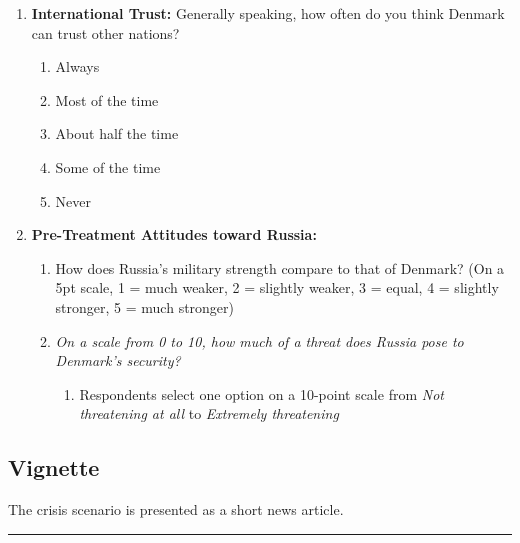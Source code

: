 \begin{enumerate}
\begin{enumerate}
        \begin{enumerate}
            \item While driving
            \item During fitness or leisure
            \item In financial matters
            \item With your own health
            \item In your career
        \end{enumerate}
    \end{enumerate}
    \item \textbf{International Trust:} Generally speaking, how often do you think Denmark can trust other nations? 
    \begin{enumerate}
        \item Always
        \item Most of the time
        \item About half the time
        \item Some of the time
        \item Never
    \end{enumerate}
    \item \textbf{Pre-Treatment Attitudes toward Russia:} 
    \begin{enumerate}
        \item How does Russia's military strength compare to that of Denmark? (On a 5pt scale, 1 = much weaker, 2 = slightly weaker, 3 = equal, 4 = slightly stronger, 5 = much stronger)
        \item \textit{On a scale from 0 to 10, how much of a threat does Russia pose to Denmark's security?}
        \begin{enumerate}
            \item Respondents select one option on a 10-point scale from \textit{Not threatening at all} to \textit{Extremely threatening}
        \end{enumerate}
    \end{enumerate}
\end{enumerate}

\subsection{Vignette}

The crisis scenario is presented as a short news article. 

\bigskip
\noindent\rule{\textwidth}{0.4pt}
\smallskip

